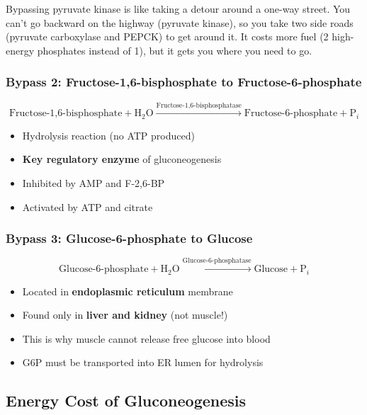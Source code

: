 \begin{analogy}
Bypassing pyruvate kinase is like taking a detour around a one-way street. You can't go backward on the highway (pyruvate kinase), so you take two side roads (pyruvate carboxylase and PEPCK) to get around it. It costs more fuel (2 high-energy phosphates instead of 1), but it gets you where you need to go.
\end{analogy}

\subsubsection{Bypass 2: Fructose-1,6-bisphosphate to Fructose-6-phosphate}

\[
\text{Fructose-1,6-bisphosphate} + \text{H}_2\text{O} \xrightarrow{\text{Fructose-1,6-bisphosphatase}} \text{Fructose-6-phosphate} + \text{P}_i
\]

\begin{itemize}
    \item Hydrolysis reaction (no ATP produced)
    \item \textbf{Key regulatory enzyme} of gluconeogenesis
    \item Inhibited by AMP and F-2,6-BP
    \item Activated by ATP and citrate
\end{itemize}

\subsubsection{Bypass 3: Glucose-6-phosphate to Glucose}

\[
\text{Glucose-6-phosphate} + \text{H}_2\text{O} \xrightarrow{\text{Glucose-6-phosphatase}} \text{Glucose} + \text{P}_i
\]

\begin{itemize}
    \item Located in \textbf{endoplasmic reticulum} membrane
    \item Found only in \textbf{liver and kidney} (not muscle!)
    \item This is why muscle cannot release free glucose into blood
    \item G6P must be transported into ER lumen for hydrolysis
\end{itemize}

\subsection{Energy Cost of Gluconeogenesis}

